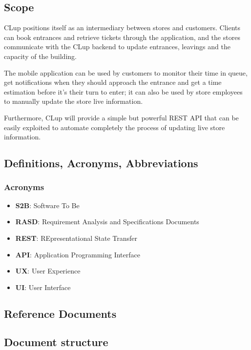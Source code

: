 \subsection{Scope}
CLup positions itself as an intermediary between stores and customers. Clients can book entrances and retrieve tickets through the application, and the stores communicate with the CLup backend to update entrances, leavings and the capacity of the building.

\medskip

The mobile application can be used by customers to monitor their time in queue, get notifications when they should approach the entrance and get a time estimation before it's their turn to enter; it can also be used by store employees to manually update the store live information.

\medskip

Furthermore, CLup will provide a simple but powerful REST API that can be easily exploited to automate completely the process of updating live store information.

\vfill

\pagebreak

\subsection{Definitions, Acronyms, Abbreviations}

\subsubsection{Acronyms}

\begin{itemize}
      \item \textbf{S2B}: Software To Be
      \item \textbf{RASD}: Requirement Analysis and Specifications Documents
      \item \textbf{REST}: REpresentational State Transfer
      \item \textbf{API}: Application Programming Interface
      \item \textbf{UX}: User Experience
      \item \textbf{UI}: User Interface
\end{itemize}

\subsection{Reference Documents}
\subsection{Document structure}
